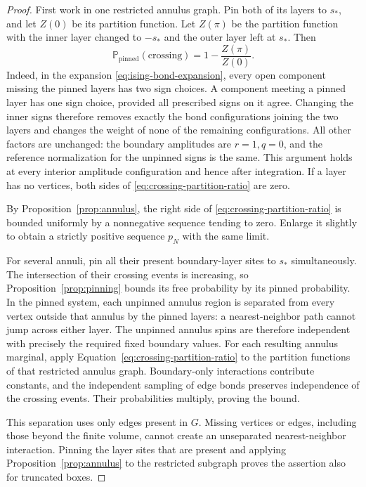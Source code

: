 \begin{proof}
First work in one restricted annulus graph.  Pin both of its layers
to $s_*$, and let $Z(0)$ be its partition function.  Let $Z(\pi)$ be
the partition function with the inner layer changed to $-s_*$ and
the outer layer left at $s_*$.  Then
\begin{equation}\label{eq:crossing-partition-ratio}
 \mathbb P_{\mathrm{pinned}}(\text{crossing})
   =1-\frac{Z(\pi)}{Z(0)}.
\end{equation}
Indeed, in the expansion \eqref{eq:ising-bond-expansion}, every open
component missing the pinned layers has two sign choices.  A component
meeting a pinned layer has one sign choice, provided all prescribed
signs on it agree.  Changing the inner signs therefore removes exactly
the bond configurations joining the two layers and changes the weight
of none of the remaining configurations.  All other factors are
unchanged: the boundary amplitudes are $r=1,q=0$, and the reference
normalization for the unpinned signs is the same.  This argument holds
at every interior amplitude configuration and hence after integration.
If a layer has no vertices, both sides of
\eqref{eq:crossing-partition-ratio} are zero.

By Proposition~\ref{prop:annulus}, the right side of
\eqref{eq:crossing-partition-ratio} is bounded uniformly by a
nonnegative sequence tending to zero.  Enlarge it slightly to obtain
a strictly positive sequence $p_N$ with the same limit.

For several annuli, pin all their present boundary-layer sites to
$s_*$ simultaneously.  The intersection of their crossing events is
increasing, so Proposition~\ref{prop:pinning} bounds its free
probability by its pinned probability.  In the pinned system, each
unpinned annulus region is separated from every vertex outside that
annulus by the pinned layers: a nearest-neighbor path cannot jump
across either layer.  The unpinned annulus spins are therefore
independent with precisely the required fixed boundary values.
For each resulting annulus marginal, apply
Equation~\eqref{eq:crossing-partition-ratio} to the partition functions
of that restricted annulus graph.
Boundary-only interactions contribute constants, and the independent
sampling of edge bonds preserves independence of the crossing events.
Their probabilities multiply, proving the bound.

This separation uses only edges present in $G$.  Missing vertices or
edges, including those beyond the finite volume, cannot create an
unseparated nearest-neighbor interaction.  Pinning the layer sites
that are present and applying Proposition~\ref{prop:annulus} to the
restricted subgraph proves the assertion also for truncated boxes.
\end{proof}

